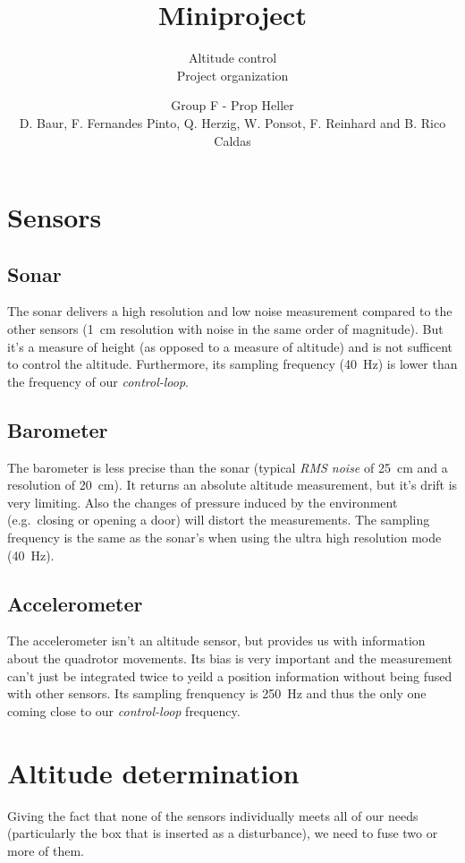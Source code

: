\documentclass{repMobRob}
\author{Group F - Prop Heller \\ D. Baur, F. Fernandes Pinto, Q. Herzig, W. Ponsot, F. Reinhard and B. Rico Caldas}
\title{Miniproject}
\subtitle{Altitude control \\ \small{Project organization}}
\begin{document}
\thispagestyle{empty}
\maketitle

\section{Sensors}
\subsection{Sonar}
The sonar delivers a high resolution and low noise measurement compared to the other sensors (\SI{1}{\centi\meter} resolution with noise in the same order of magnitude).
But it's a measure of height (as opposed to a measure of altitude) and is not sufficent to control the altitude.
Furthermore, its sampling frequency (\SI{40}{\hertz}) is lower than the frequency of our \emph{control-loop}.

\subsection{Barometer}
The barometer is less precise than the sonar (typical \emph{RMS noise} of \SI{25}{\centi\meter} and a resolution of \SI{20}{\centi\meter}).
It returns an absolute altitude measurement, but it's drift is very limiting.
Also the changes of pressure induced by the environment (e.g.\ closing or opening a door) will distort the measurements.
The sampling frequency is the same as the sonar's when using the ultra high resolution mode (\SI{40}{\hertz}).

\subsection{Accelerometer}
The accelerometer isn't an altitude sensor, but provides us with information about the quadrotor movements.
Its bias is very important and the measurement can't just be integrated twice to yeild a position information without being fused with other sensors.
Its sampling frenquency is \SI{250}{\hertz} and thus the only one coming close to our \emph{control-loop} frequency. 

\section{Altitude determination}
Giving the fact that none of the sensors individually meets all of our needs (particularly the box that is inserted as a disturbance), we need to fuse two or more of them. 
\end{document}
